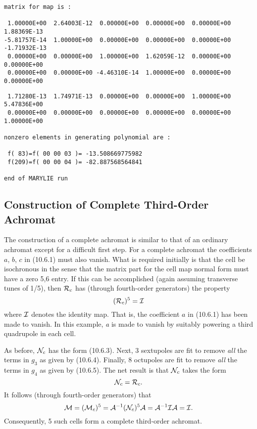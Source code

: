 \begin{footnotesize}
\begin{verbatim}
matrix for map is :

 1.00000E+00  2.64003E-12  0.00000E+00  0.00000E+00  0.00000E+00  1.88369E-13
-5.81757E-14  1.00000E+00  0.00000E+00  0.00000E+00  0.00000E+00 -1.71932E-13
 0.00000E+00  0.00000E+00  1.00000E+00  1.62059E-12  0.00000E+00  0.00000E+00
 0.00000E+00  0.00000E+00 -4.46310E-14  1.00000E+00  0.00000E+00  0.00000E+00
\end{verbatim}
\end{footnotesize}

\begin{footnotesize}
\begin{verbatim}
 1.71280E-13  1.74971E-13  0.00000E+00  0.00000E+00  1.00000E+00  5.47836E+00
 0.00000E+00  0.00000E+00  0.00000E+00  0.00000E+00  0.00000E+00  1.00000E+00

nonzero elements in generating polynomial are :

 f( 83)=f( 00 00 03 )= -13.508669775982
 f(209)=f( 00 00 04 )= -82.887568564841

end of MARYLIE run
\end{verbatim}
\end{footnotesize}

\subsection{Construction of Complete Third-Order Achromat} 
\label{complete}
The construction of a complete achromat is similar to that of an ordinary
achromat except for a difficult first step.  For a complete achromat the
coefficients $a$, $b$, $c$ in (10.6.1) must also vanish.  What is required initially
is that the cell be isochronous in the sense that the matrix part for the
cell map normal form must have a zero 5,6 entry.  If this can be
accomplished (again assuming transverse tunes of 1/5), then ${\cal R}_c$
has (through fourth-order generators) the property
\begin{equation}
({\cal R}_c)^5 = {\cal I}
\end{equation}
where ${\cal I}$ denotes the identity map.  That is, the coefficient $a$
in (10.6.1) has been made to vanish.  In this example, {\em a} is made
to vanish by suitably powering a third quadrupole in each cell.

As before, ${\cal N}_c$ has the form (10.6.3).  Next, 3 sextupoles are fit
to remove {\em all} the terms in $g_3$ as given by (10.6.4).  Finally, 8
octupoles are fit to remove {\em all} the terms in $g_4$ as given by
(10.6.5).  The net result is that ${\cal N}_c$ takes the form
\begin{equation}
{\cal N}_c = {\cal R}_c.
\end{equation}
It follows (through fourth-order generators) that
\begin{equation}
{\cal M} = ({\cal M}_c)^5 = {\cal A}^{-1} ({\cal N}_c)^5 {\cal A} = {\cal
A}^{-1} {\cal I}{\cal A} = {\cal I}.
\end{equation}
Consequently, 5 such cells form a complete third-order achromat.

